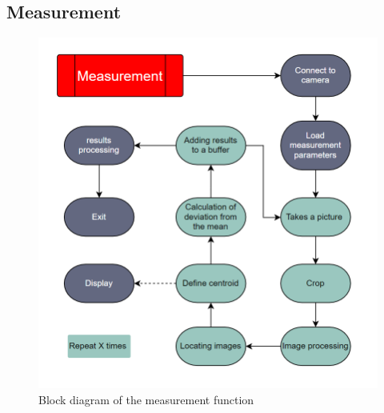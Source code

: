 \subsection{Measurement}
\begin{figure}[H]
    \centering
    \includegraphics[scale=0.85]{assets/figures/Software/Measurement.png}
    \caption{Block diagram of the measurement function}
    \label{fig:Soft_Meas}
\end{figure}
\newpage

